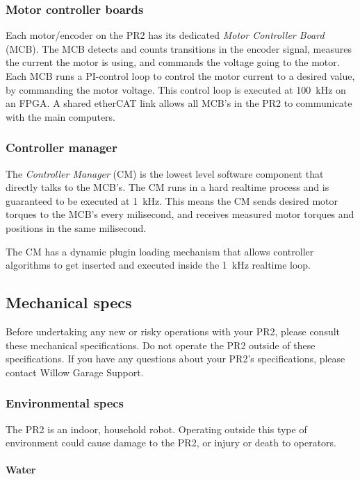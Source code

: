 \subsubsection{Motor controller boards}
Each motor/encoder on the PR2 has its dedicated \emph{Motor Controller
  Board} (MCB). The MCB detects and counts transitions in the encoder
signal, measures the current the motor is using, and commands the
voltage going to the motor. Each MCB runs a PI-control loop to control
the motor current to a desired value, by commanding the motor
voltage. This control loop is executed at 100~kHz on an FPGA.  A
shared etherCAT link allows all MCB's in the PR2 to communicate with
the main computers.

\subsubsection{Controller manager}
The \emph{Controller Manager} (CM) is the lowest level software
component that directly talks to the MCB's. The CM runs in a hard
realtime process and is guaranteed to be executed at 1~kHz. This means
the CM sends desired motor torques to the MCB's every milisecond, and
receives measured motor torques and positions in the same milisecond.

The CM has a dynamic plugin loading mechanism that allows controller
algorithms to get inserted and executed inside the 1~kHz realtime
loop.


\subsection{Mechanical specs}

Before undertaking any new or risky operations with your PR2, please consult these mechanical specifications. Do not operate the PR2 outside of these specifications. If you have any questions about your PR2's specifications, please contact Willow Garage Support.

\subsubsection{Environmental specs}

The PR2 is an indoor, household robot. Operating outside this type of environment could cause damage to the PR2, or injury or death to operators.

\paragraph{Water}

